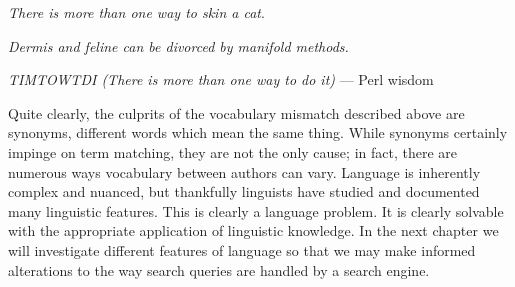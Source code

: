 \begin{center}
\textit{There is more than one way to skin a cat}.

\textit{Dermis and feline can be divorced by manifold methods.}

\textit{TIMTOWTDI (There is more than one way to do it)} --- Perl wisdom 
\end{center}

Quite clearly, the culprits of the vocabulary mismatch described above are synonyms, different words which mean the same thing. While synonyms certainly impinge on term matching, they are not the only cause; in fact, there are numerous ways vocabulary between authors can vary. Language is inherently complex and nuanced, but thankfully linguists have studied and documented many linguistic features. This is clearly a language problem. It is clearly solvable with the appropriate application of linguistic knowledge. In the next chapter we will investigate different features of language so that we may make informed alterations to the way search queries are handled by a search engine.










